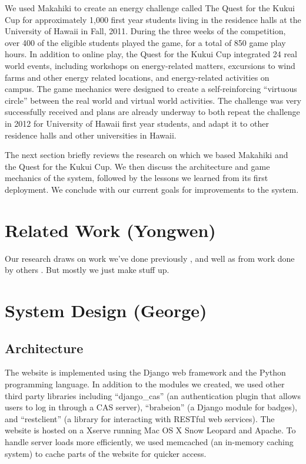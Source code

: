 \documentclass{acm_proc_article-sp}
\begin{document}
We used Makahiki to create an energy challenge called The Quest for the
Kukui Cup for approximately 1,000 first year students living in the
residence halls at the University of Hawaii in Fall, 2011.  During the
three weeks of the competition, over 400 of the eligible students played
the game, for a total of 850 game play hours.  In addition to online play,
the Quest for the Kukui Cup integrated 24 real world events, including
workshops on energy-related matters, excursions to wind farms and other
energy related locations, and energy-related activities on campus. The game
mechanics were designed to create a self-reinforcing ``virtuous circle''
between the real world and virtual world activities.  The challenge was
very successfully received and plans are already underway to both repeat
the challenge in 2012 for University of Hawaii first year students, and 
adapt it to other residence halls and other universities in Hawaii.

The next section briefly reviews the research on which we based Makahiki
and the Quest for the Kukui Cup.   We then discuss the architecture and
game mechanics of the system, followed by the lessons we learned from its
first deployment. We conclude with our current goals for improvements to
the system.

\section{Related Work (Yongwen)}
Our research draws on work we've done previously
\cite{csdl2-10-05,csdl2-10-07,csdl2-11-02,csdl2-11-03}, and well as from
work done by others \cite{Lazzaro2010}.  But mostly we just make stuff up.

\section{System Design (George)}

\subsection{Architecture}

The website is implemented using the Django web framework and the Python programming language. In addition to the modules we created, we used other third party libraries including ``django_cas'' (an authentication plugin that allows users to log in through a CAS server), ``brabeion'' (a Django module for badges), and ``restclient'' (a library for interacting with RESTful web services). The website is hosted on a Xserve running Mac OS X Snow Leopard and Apache. To handle server loads more efficiently, we used memcached (an in-memory caching system) to cache parts of the website for quicker access.
\end{document}
